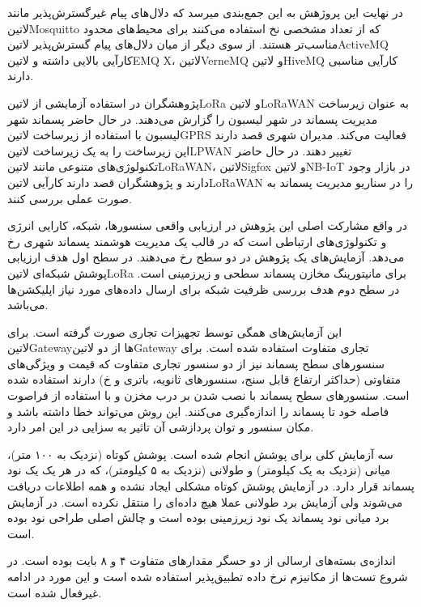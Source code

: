 در نهایت این پروژهش به این جمع‌بندی میرسد که دلال‌های پیام غیرگسترش‌پذیر مانند ‌لاتین{Mosquitto} که از تعداد مشخصی نخ استفاده می‌کنند برای محیط‌های محدود مناسب‌تر هستند.
از سوی دیگر از میان دلال‌های پیام گسترش‌پذیر ‌لاتین{ActiveMQ} کارآیی بالایی داشته و ‌لاتین{EMQ X}، ‌لاتین{VerneMQ} و ‌لاتین{HiveMQ} کارآیی مناسبی دارند.


پژوهشگران در  استفاده آزمایشی از ‌لاتین{LoRa} و ‌لاتین{LoRaWAN} به عنوان زیرساخت مدیریت پسماند در شهر لیسبون را گزارش می‌دهند.
در حال حاضر پسماند شهر لیسبون با استفاده از زیرساخت ‌لاتین{GPRS} فعالیت می‌کند. مدیران شهری قصد دارند این زیرساخت را به یک زیرساخت ‌لاتین{LPWAN} تغییر دهند.
در حال حاضر تکنولوژی‌های متنوعی مانند ‌لاتین{LoRaWAN}، ‌لاتین{Sigfox} و ‌لاتین{NB-IoT} در بازار وجود دارند و پژوهشگران قصد دارند کارآیی ‌لاتین{LoRaWAN} را در
سناریو مدیریت پسماند به صورت عملی بررسی کنند.

در واقع مشارکت اصلی این پژوهش در ارزیابی واقعی سنسورها، شبکه، کارایی انرژی و تکنولوژی‌های ارتباطی است که در قالب یک مدیریت هوشمند پسماند شهری رخ می‌دهد.
آزمایش‌های یک پژوهش در دو سطح رخ می‌دهند. در سطح اول هدف ارزیابی پوشش شبکه‌ای ‌لاتین{LoRa} برای مانیتورینگ مخازن پسماند سطحی و زیرزمینی است.
در سطح دوم هدف بررسی ظرفیت شبکه برای ارسال داده‌های مورد نیاز اپلیکشن‌ها می‌باشد.

این آزمایش‌های همگی توسط تجهیزات تجاری صورت گرفته است. برای ‌لاتین{Gateway}ها از دو ‌لاتین{Gateway} تجاری متفاوت استفاده شده است.
برای سنسورهای سطح پسماند نیز از دو سنسور تجاری متفاوت که قیمت و ویژگی‌های متفاوتی (حداکثر ارتفاع قابل سنج، سنسورهای ثانویه، باتری و ‌خ) دارند استفاده شده است.
سنسورهای سطح پسماند با نصب شدن بر درب مخزن و با استفاده از فراصوت فاصله خود تا پسماند را اندازه‌گیری می‌کنند. این روش می‌تواند خطا داشته باشد
و مکان سنسور و توان پردازشی آن تاثیر به سزایی در این امر دارد.

سه آزمایش کلی برای پوشش انجام شده است. پوشش کوتاه (نزدیک به ۱۰۰ متر)، میانی (نزدیک به یک کیلومتر) و طولانی (نزدیک به ۵ کیلومتر)، که در هر یک یک نود پسماند قرار دارد.
در آزمایش پوشش کوتاه مشکلی ایجاد نشده و همه اطلاعات دریافت می‌شوند ولی آزمایش برد طولانی عملا هیچ داده‌ای را منتقل نکرده است.
در آزمایش برد میانی نود پسماند یک نود زیرزمینی بوده است و چالش اصلی طراحی نود بوده است.

اندازه‌ی بسته‌های ارسالی از دو حسگر مقدارهای متفاوت ۴ و ۸ بایت بوده است. در شروع تست‌ها از مکانیزم نرخ داده تطبیق‌پذیر استفاده شده است و این مورد در ادامه غیرفعال شده است.

